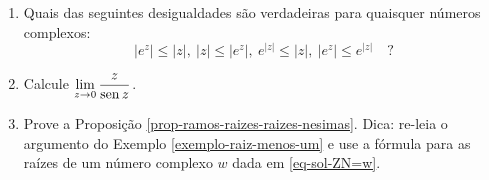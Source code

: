 \begin{enumerate}[leftmargin=*]
	\item Quais das seguintes desigualdades são verdadeiras para quaisquer números complexos:
	$$
	|e^z|\leq |z|, \ |z|\leq |e^z|,\ e^{|z|}\leq |z|,\ |e^z|\leq e^{|z|}\quad ?
	$$

	\item Calcule $\displaystyle\lim_{z\to 0}\frac{z}{\operatorname{sen} z}$.
	
	
	\item Prove a Proposição \ref{prop-ramos-raizes-raizes-nesimas}.
	Dica: re-leia o argumento do Exemplo \ref{exemplo-raiz-menos-um} e use a fórmula
	para as raízes de um número complexo $w$ dada em \ref{eq-sol-ZN=w}. 
	
\end{enumerate}